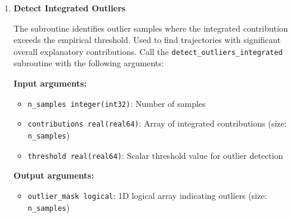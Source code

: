 \begin{enumerate}
\begin{enumerate}
\begin{enumerate}
\begin{itemize}
                            \item \texttt{ierr integer(int32)}: Error code (for error
                                  details please check
                                  \hyperref[sec:error-handling]{error handling section})
                          \end{itemize}
                          \begin{lstlisting}[language=Fortran, caption={Integrated Threshold Calculation}]
call calc_integrated_threshold(contributions, n_samples, &
                            percentile_val, threshold, &
                            permutation, ierr)
                          \end{lstlisting}
                          
                    \item \textbf{Detect Integrated Outliers}
                          
                          The subroutine identifies outlier samples where the integrated contribution
                          exceeds the empirical threshold. Used to find trajectories with
                          significant overall explanatory contributions. Call the \texttt{detect\_outliers\_integrated}
                          subroutine with the following arguments:
                          
                          \textbf{Input arguments:}
                          \begin{itemize}
                            \item \texttt{n\_samples integer(int32)}: Number of samples
                                  
                            \item \texttt{contributions real(real64)}: Array of integrated contributions
                                  (size: \texttt{n\_samples})
                                  
                            \item \texttt{threshold real(real64)}: Scalar threshold value for
                                  outlier detection
                          \end{itemize}
                          \textbf{Output arguments:}
                          \begin{itemize}
                            \item \texttt{outlier\_mask logical}: 1D logical array indicating
                                  outliers (size: \texttt{n\_samples})
                                  

\end{itemize}
\end{enumerate}
\end{enumerate}
\end{enumerate}
